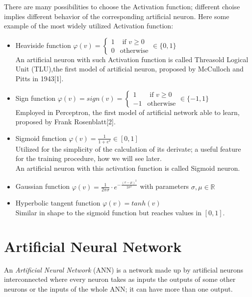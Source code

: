 There are many possibilities to choose the Activation function; different choise implies different behavior of the corresponding artificial neuron.
Here some example of the most widely utilized Activation function:
\begin{itemize}
 \item Heaviside function $\varphi(v)=\begin{cases} 1 &  \mbox{ if } v \geq 0 \\ 0 & \mbox{otherwise} \end{cases} \in \{ 0,1 \} $  \\
An artificial neuron with such Activation function is called Threasold Logical Unit (TLU),the first model of artificial neuron, proposed by McCulloch and Pitts in 1943[1].
\item Sign function $\varphi(v)= sign(v)=\begin{cases} 1 &  \mbox{ if } v \geq 0 \\ -1 & \mbox{otherwise} \end{cases} \in \{ -1,1 \} $ \\
Employed in Perceptron, the first model of artificial network able to learn, proposed by Frank Rosenblatt[2].
\item Sigmoid function $\varphi(v)= \frac{1}{1+ e^{v}} \in [ 0,1 ]$ \\
Utilized for the simplicity of the calculation of its derivate; a useful feature for the training procedure, how we will see later. \\
An artificial neuron with this activation function is called Sigmoid neuron.
\item Gaussian function $\varphi(v)=\frac{1}{2 \pi \sigma} \cdot e^{ -\frac{(v-\mu)^2}{2 \sigma^2}}$  with parameters $\sigma, \mu \in \mathbb{R}$ 
\item Hyperbolic tangent function $\varphi(v)=tanh(v)$\\
Similar in shape to the sigmoid function but reaches values in $[0,1]$.
\end{itemize}
\newpage
\section{Artificial Neural Network}

\begin{defn}
An \emph{Artificial Neural Network} (ANN)  is a network made up by artificial neurons interconnected where every neuron takes as inputs the outputs of some other neurons or the inputs of the whole ANN; it can have more than one output.
\end{defn}

